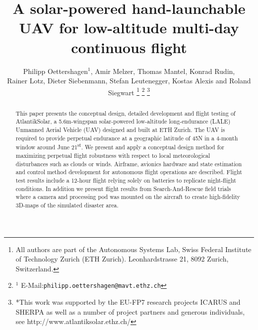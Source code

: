 \documentclass[letterpaper, 10 pt, conference]{ieeeconf}  %
\title{\LARGE \bf A solar-powered hand-launchable UAV for low-altitude multi-day continuous flight}
\author{Philipp Oettershagen$^{1}$, Amir Melzer, Thomas Mantel, Konrad Rudin, \\ Rainer Lotz, Dieter Siebenmann, Stefan Leutenegger, Kostas Alexis and Roland Siegwart%
\thanks{All authors are part of the Autonomous Systems Lab, Swiss Federal Institute of Technology Zurich (ETH Zurich). Leonhardstrasse 21, 8092 Zurich, Switzerland. }
\thanks{$^{1}$ E-Mail:{\tt philipp.oettershagen@mavt.ethz.ch}}%
\thanks{*This work was supported by the EU-FP7 research projects ICARUS and SHERPA as well as a number of project partners and generous individuals, see http://www.atlantiksolar.ethz.ch/  }%
 }
\begin{document}
\maketitle
\thispagestyle{empty}
\pagestyle{empty}

\begin{abstract}
This paper presents the conceptual design, detailed development and flight testing of AtlantikSolar, a 5.6m-wingspan solar-powered low-altitude long-endurance (LALE) Unmanned Aerial Vehicle (UAV) designed and built at ETH Zurich. The UAV is required to provide perpetual endurance at a geographic latitude of 45\degree N in a 4-month window around June 21\textsuperscript{st}. We present and apply a conceptual design method for maximizing perpetual flight robustness with respect to local meteorological disturbances such as clouds or winds. Airframe, avionics hardware and state estimation and control method development for autonomous flight operations are described. Flight test results include a 12-hour flight relying solely on batteries to replicate night-flight conditions. In addition we present flight results from Search-And-Rescue field trials where a camera and processing pod was mounted on the aircraft to create high-fidelity 3D-maps of the simulated disaster area. 
\end{abstract}








\end{document}
